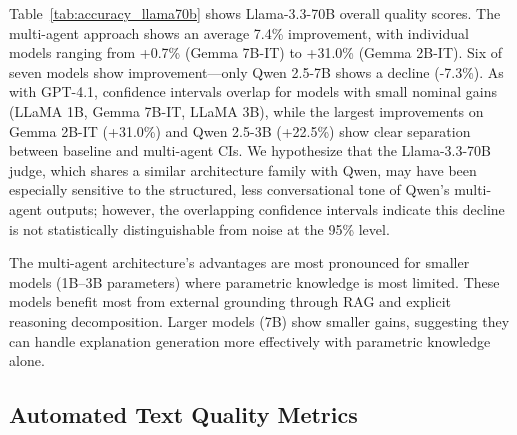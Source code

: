 Table~\ref{tab:accuracy_llama70b} shows Llama-3.3-70B overall quality scores. The multi-agent approach shows an average 7.4\% improvement, with individual models ranging from +0.7\% (Gemma 7B-IT) to +31.0\% (Gemma 2B-IT). Six of seven models show improvement---only Qwen 2.5-7B shows a decline (-7.3\%). As with GPT-4.1, confidence intervals overlap for models with small nominal gains (LLaMA 1B, Gemma 7B-IT, LLaMA 3B), while the largest improvements on Gemma 2B-IT (+31.0\%) and Qwen 2.5-3B (+22.5\%) show clear separation between baseline and multi-agent CIs. We hypothesize that the Llama-3.3-70B judge, which shares a similar architecture family with Qwen, may have been especially sensitive to the structured, less conversational tone of Qwen's multi-agent outputs; however, the overlapping confidence intervals indicate this decline is not statistically distinguishable from noise at the 95\% level.

The multi-agent architecture's advantages are most pronounced for smaller models (1B--3B parameters) where parametric knowledge is most limited. These models benefit most from external grounding through RAG and explicit reasoning decomposition. Larger models (7B) show smaller gains, suggesting they can handle explanation generation more effectively with parametric knowledge alone.

\subsection{Automated Text Quality Metrics}

